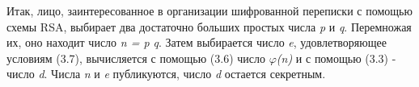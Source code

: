   Итак, лицо, заинтересованное в организации шифрованной переписки с помощью схемы RSA, выбирает два достаточно больших простых числа \textit{p} и \textit{q}. 
Перемножая их, оно находит число \textit{n = p q}. Затем выбирается число \textit{e}, удовлетворяющее условиям (3.7), вычисляется с помощью (3.6) 
число \textit{{$\varphi$}(n)} и с помощью (3.3) - число \textit{d}. Числа \textit{n} и \textit{e} публикуются, число \textit{d} остается секретным. 
\begin{comment}
  Для иллюстрации своего метода Ривест, Шамир и Адлеман зашифровали таким способом некоторую английскую фразу. Сначала она стандартным образом 
(а=01, b=02, .... z=26, пробел=00) была записана в виде целого числа \textit{x}, а затем зашифрована с помощью отображения (3.1) при
\begin{center}
 \textit{m=11438162575788886766932577997614661201021829672124236256256184293570 6935245733897830597123563958705058989075147599290026879543541}
\end{center}
и 
\begin{center}
 \textit{e=9007}.
\end{center}
Эти два числа были опубликованы, причем дополнительно сообщалось, что \textit{n = p q}. где \textit{p} и \textit{q} - простые числа, записываемые 
соответственно 64 и 65 десятичными знаками. 

  Сложность алгоритмов теории чисел обычно принято измерять количеством арифметических операций (сложений, вычитаний, умножений и делений с остатком), 
необходимых для выполнения всех действий, предписанных алгоритмом. Впрочем, это определение не учитывает величины чисел, участвующих в вычислениях. 
Ясно, что перемножить два стозначных числа значительно сложнее, чем два однозначных, хотя при этом и в том, и в другом случае выполняется лишь одна 
арифметическая операция. Поэтому иногда учитывают ещё и величину чисел, сводя дело к так называемым битовым операциям, т. е. оценивая количество 
необходимых операций с цифрами 0 и 1, в двоичной записи чисел.
Говоря о сложности алгоритмов, мы будем иметь в виду количество арифметических операций. При построении эффективных алгоритмов и обсуждении верхних 
оценок сложности обычно хватает интуитивных понятий той области математики, которой принадлежит алгоритм. Формализация же этих понятий требуется лишь 
тогда, когда речь идёт об отсутствии алгоритма или доказательстве нижних опенок сложности.
Приведем теперь примеры достаточно быстрых алгоритмов с опенками их сложности. Здесь и в дальнейшем мы не будем придерживаться формального описания 
алгоритмов, стараясь в первую очередь объяснить смысл выполняемых действий.
\end{comment}

